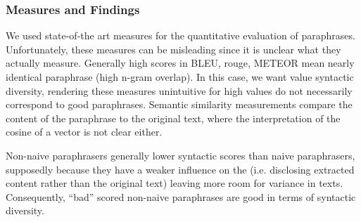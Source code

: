 %     

\subsubsection{Measures and Findings}
\label{subsec:measures_and_findings}

We used state-of-the art measures for the quantitative evaluation of paraphrases. 
Unfortunately, these measures can be misleading since it is unclear what they actually measure.
Generally high scores in BLEU, \ac{rouge}, METEOR mean nearly identical paraphrase (high n-gram overlap).
In this case, we want value syntactic diversity, rendering these measures unintuitive 
for high values do not necessarily correspond to good paraphrases.
Semantic similarity measurements compare the content of the paraphrase to the original text, 
where the interpretation of the cosine of a vector is not clear either.

Non-naive paraphrasers generally lower syntactic scores than naive paraphrasers,
supposedly because they have a weaker influence on the \pgenerator{} 
(i.e. disclosing extracted content rather than the original text)
leaving more room for variance in texts.
Consequently, \enquote{bad} scored non-naive paraphrases are good in terms of syntactic diversity.